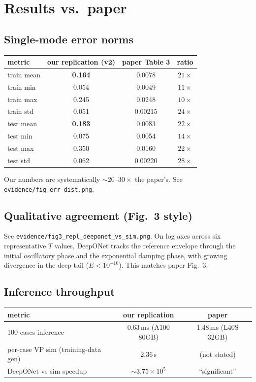\documentclass[11pt]{article}
\begin{document}
\section{Results vs.\ paper}

\subsection{Single-mode error norms}

\begin{center}
\begin{tabular}{lccc}
\toprule
metric & our replication (v2) & paper Table 3 & ratio \\
\midrule
train mean & \textbf{0.164} & 0.0078 & $21\times$ \\
train min & 0.054 & 0.0049 & $11\times$ \\
train max & 0.245 & 0.0248 & $10\times$ \\
train std & 0.051 & 0.00215 & $24\times$ \\
test mean & \textbf{0.183} & 0.0083 & $22\times$ \\
test min & 0.075 & 0.0054 & $14\times$ \\
test max & 0.350 & 0.0160 & $22\times$ \\
test std & 0.062 & 0.00220 & $28\times$ \\
\bottomrule
\end{tabular}
\end{center}

Our numbers are systematically $\sim 20$--$30\times$ the paper's. See
\texttt{evidence/fig\_err\_dist.png}.

\subsection{Qualitative agreement (Fig.~3 style)}

See \texttt{evidence/fig3\_repl\_deeponet\_vs\_sim.png}. On log axes across six
representative $T$ values, DeepONet tracks the reference envelope through the initial
oscillatory phase and the exponential damping phase, with growing divergence in the
deep tail ($E < 10^{-10}$). This matches paper Fig.~3.

\subsection{Inference throughput}

\begin{center}
\begin{tabular}{lcc}
\toprule
metric & our replication & paper \\
\midrule
100 cases inference & 0.63\,ms (A100 80GB) & 1.48\,ms (L40S 32GB) \\
per-case VP sim (training-data gen) & 2.36\,s & (not stated) \\
DeepONet vs sim speedup & $\sim 3.75 \times 10^5$ & ``significant'' \\
\bottomrule
\end{tabular}
\end{center}
\end{document}
